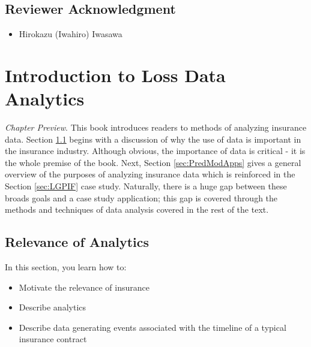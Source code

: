 \documentclass[]{book}
\providecommand{\tightlist}{%
  \setlength{\itemsep}{0pt}\setlength{\parskip}{0pt}}
\theoremstyle{definition}
\theoremstyle{definition}
\theoremstyle{definition}
\theoremstyle{remark}
\begin{document}
\section*{Reviewer Acknowledgment}\label{reviewer-acknowledgment}

\begin{itemize}
\tightlist
\item
  Hirokazu (Iwahiro) Iwasawa
\end{itemize}

\chapter{Introduction to Loss Data
Analytics}\label{introduction-to-loss-data-analytics}

\emph{Chapter Preview}. This book introduces readers to methods of
analyzing insurance data. Section \ref{sec:Intro} begins with a
discussion of why the use of data is important in the insurance
industry. Although obvious, the importance of data is critical - it is
the whole premise of the book. Next, Section \ref{sec:PredModApps} gives
a general overview of the purposes of analyzing insurance data which is
reinforced in the Section \ref{sec:LGPIF} case study. Naturally, there
is a huge gap between these broads goals and a case study application;
this gap is covered through the methods and techniques of data analysis
covered in the rest of the text.

\section{Relevance of Analytics}\label{sec:Intro}

In this section, you learn how to:

\begin{itemize}
\tightlist
\item
  Motivate the relevance of insurance
\item
  Describe analytics
\item
  Describe data generating events associated with the timeline of a
  typical insurance contract
\end{itemize}
\end{document}
